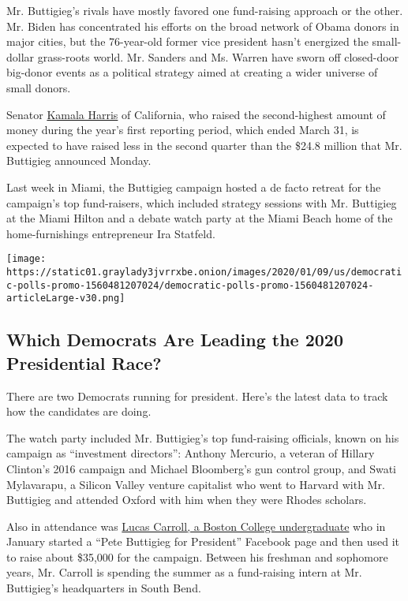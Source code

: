 Mr. Buttigieg's rivals have mostly favored one fund-raising approach or
the other. Mr. Biden has concentrated his efforts on the broad network
of Obama donors in major cities, but the 76-year-old former vice
president hasn't energized the small-dollar grass-roots world. Mr.
Sanders and Ms. Warren have sworn off closed-door big-donor events as a
political strategy aimed at creating a wider universe of small donors.

Senator
\href{https://www.nytimes3xbfgragh.onion/interactive/2020/us/elections/kamala-harris.html}{Kamala
Harris} of California, who raised the second-highest amount of money
during the year's first reporting period, which ended March 31, is
expected to have raised less in the second quarter than the \$24.8
million that Mr. Buttigieg announced Monday.

Last week in Miami, the Buttigieg campaign hosted a de facto retreat for
the campaign's top fund-raisers, which included strategy sessions with
Mr. Buttigieg at the Miami Hilton and a debate watch party at the Miami
Beach home of the home-furnishings entrepreneur Ira Statfeld.

\href{https://www.nytimes3xbfgragh.onion/interactive/2020/us/elections/democratic-polls.html}{}

\texttt{[image: https://static01.graylady3jvrrxbe.onion/images/2020/01/09/us/democratic-polls-promo-1560481207024/democratic-polls-promo-1560481207024-articleLarge-v30.png]}

\hypertarget{which-democrats-are-leading-the-2020-presidential-race}{%
\subsection{Which Democrats Are Leading the 2020 Presidential
Race?}\label{which-democrats-are-leading-the-2020-presidential-race}}

There are two Democrats running for president. Here's the latest data to
track how the candidates are doing.

The watch party included Mr. Buttigieg's top fund-raising officials,
known on his campaign as ``investment directors'': Anthony Mercurio, a
veteran of Hillary Clinton's 2016 campaign and Michael Bloomberg's gun
control group, and Swati Mylavarapu, a Silicon Valley venture capitalist
who went to Harvard with Mr. Buttigieg and attended Oxford with him when
they were Rhodes scholars.

Also in attendance was
\href{https://www.nytimes3xbfgragh.onion/2019/04/22/us/politics/youth-voters-2020.html}{Lucas
Carroll, a Boston College undergraduate} who in January started a ``Pete
Buttigieg for President'' Facebook page and then used it to raise about
\$35,000 for the campaign. Between his freshman and sophomore years, Mr.
Carroll is spending the summer as a fund-raising intern at Mr.
Buttigieg's headquarters in South Bend.

